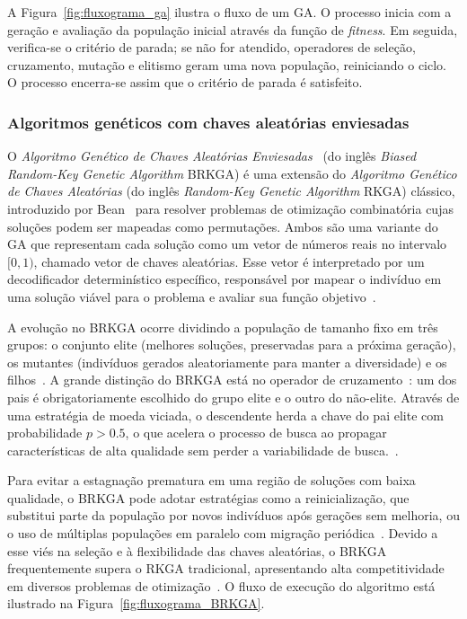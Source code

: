 \documentclass[11pt]{article}
\begin{document}
    A Figura~\ref{fig:fluxograma_ga} ilustra o fluxo de um GA. O processo inicia com a geração e avaliação da população inicial através da função de \emph{fitness}. Em seguida, verifica-se o critério de parada; se não for atendido, operadores de seleção, cruzamento, mutação e elitismo geram uma nova população, reiniciando o ciclo. O processo encerra-se assim que o critério de parada é satisfeito.

\subsubsection{Algoritmos genéticos com chaves aleatórias enviesadas}
   
O \emph{Algoritmo Genético de Chaves Aleatórias Enviesadas}~\cite{Resende2013} (do inglês \emph{Biased Random-Key Genetic Algorithm} BRKGA) é uma extensão do \emph{Algoritmo Genético de Chaves Aleatórias} (do inglês \emph{Random-Key Genetic Algorithm} RKGA) clássico, introduzido por Bean~\cite{Bean1994} para resolver problemas de otimização combinatória cujas soluções podem ser mapeadas como permutações. Ambos são uma variante do GA que representam cada solução como um vetor de números reais no intervalo $[0,1)$, chamado vetor de chaves aleatórias. Esse vetor é interpretado por um decodificador determinístico específico, responsável por mapear o indivíduo em uma solução viável para o problema e avaliar sua função objetivo~\cite{Resende2013}.

A evolução no BRKGA ocorre dividindo a população de tamanho fixo em três grupos: o conjunto elite (melhores soluções, preservadas para a próxima geração), os mutantes (indivíduos gerados aleatoriamente para manter a diversidade) e os filhos~\cite{Goncalves2011}. A grande distinção do BRKGA está no operador de cruzamento~\cite{Spears1991}: um dos pais é obrigatoriamente escolhido do grupo elite e o outro do não-elite. Através de uma estratégia de moeda viciada, o descendente herda a chave do pai elite com probabilidade $p > 0.5$, o que acelera o processo de busca ao propagar características de alta qualidade sem perder a variabilidade de busca.~\cite{Resende2013}.

Para evitar a estagnação prematura em uma região de soluções com baixa qualidade, o BRKGA pode adotar estratégias como a reinicialização, que substitui parte da população por novos indivíduos após gerações sem melhoria, ou o uso de múltiplas populações em paralelo com migração periódica~\cite{Resende2013}. Devido a esse viés na seleção e à flexibilidade das chaves aleatórias, o BRKGA frequentemente supera o RKGA tradicional, apresentando alta competitividade em diversos problemas de otimização~\cite{Resende2013,Londe2025}. O fluxo de execução do algoritmo está ilustrado na Figura~\ref{fig:fluxograma_BRKGA}.
\end{document}

